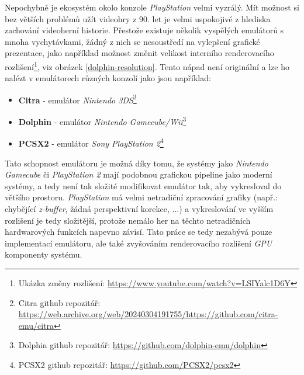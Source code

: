 Nepochybně je ekosystém okolo konzole \textit{PlayStation} velmi vyzrálý. 
Mít možnost si bez větších problémů užít videohry z 90. let je velmi uspokojivé z hlediska zachování videoherní historie. 
Přestože existuje několik vyspělých emulátorů s mnoha vychytávkami, 
žádný z nich se nesoustředí na vylepšení grafické prezentace, jako například možnost 
změnit velikost interního renderovacího rozlišení\footnote{Ukázka změny rozlišení: \url{https://www.youtube.com/watch?v=LSIYalc1D6Y}}, viz obrázek \ref{dolphin-resolution}. Tento nápad není originální a lze ho nalézt v emulátorech různých konzolí jako jsou například:

\begin{itemize}
\item{\textbf{Citra} - emulátor \textit{Nintendo 3DS}\footnote{Citra github repozitář: \url{https://web.archive.org/web/20240304191755/https://github.com/citra-emu/citra}}}
\item{\textbf{Dolphin} - emulátor \textit{Nintendo Gamecube/Wii}\footnote{Dolphin github repozitář: \url{https://github.com/dolphin-emu/dolphin}}}
\item{\textbf{PCSX2} - emulátor \textit{Sony PlayStation 2}\footnote{PCSX2 github repozitář: \url{https://github.com/PCSX2/pcsx2}}}
\end{itemize}

Tato schopnost emulátoru je možná díky tomu, že systémy jako \textit{Nintendo Gamecube} 
či \textit{PlayStation 2} mají podobnou grafickou pipeline jako moderní systémy, 
a tedy není tak složité modifikovat emulátor tak, aby vykresloval do většího prostoru. \textit{PlayStation} má velmi netradiční zpracování 
grafiky (např.: chybějící \textit{z-buffer}, žádná perspektivní korekce, ...) a vykreslování ve vyšším 
rozlišení je tedy složitější, protože nemálo her na těchto netradičních hardwarových funkcích napevno závisí.
Tato práce se tedy nezabývá pouze implementací emulátoru, ale také zvyšováním renderovacího rozlišení \textit{GPU} komponenty systému.
